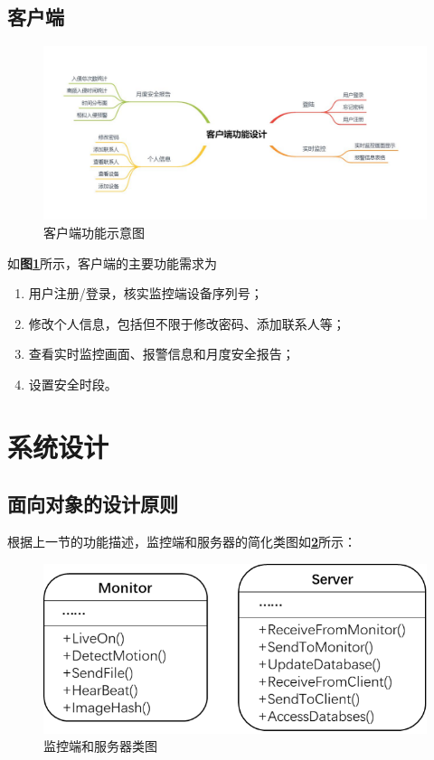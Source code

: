 \documentclass[article]{BJTU-thesis}
\begin{document}
\subsection{客户端}
\begin{figure}[!htbp]
	\centering
	\includegraphics{img/4.jpg}
	\caption{客户端功能示意图}\label{fig:fig4}
\end{figure}
如\textbf{图\ref{fig:fig4}}所示，客户端的主要功能需求为
\newpage
\begin{enumerate}
	\item 用户注册/登录，核实监控端设备序列号；
	\item 修改个人信息，包括但不限于修改密码、添加联系人等；
	\item 查看实时监控画面、报警信息和月度安全报告；
	\item 设置安全时段。
	
\end{enumerate}

\section{系统设计}
\subsection{面向对象的设计原则}

根据上一节的功能描述，监控端和服务器的简化类图如\textbf{\ref{fig:fig25}}所示：

\begin{figure}[!htbp]
	\centering
	\includegraphics[scale=1]{img/22.png}
	\caption{监控端和服务器类图}\label{fig:fig25}
\end{figure}
\end{document}
